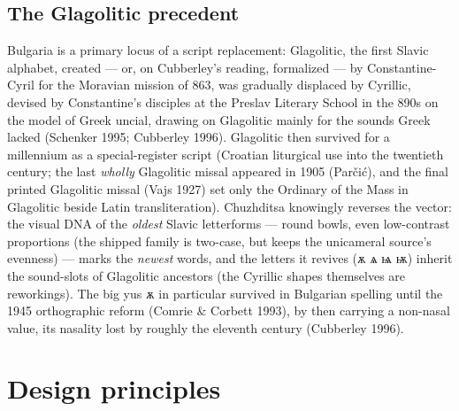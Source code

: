 \documentclass[12pt]{article}
\newcommand{\cz}[1]{{\chu #1}}
\begin{document}
\subsection{The Glagolitic precedent}
Bulgaria is a primary locus of a script replacement: Glagolitic, the first Slavic alphabet, created — or, on Cubberley's reading, formalized — by Constantine-Cyril for the Moravian mission of 863, was gradually displaced by Cyrillic, devised by Constantine's disciples at the Preslav Literary School in the 890s on the model of Greek uncial, drawing on Glagolitic mainly for the sounds Greek lacked (Schenker 1995; Cubberley 1996). Glagolitic then survived for a millennium as a special-register script (Croatian liturgical use into the twentieth century; the last \emph{wholly} Glagolitic missal appeared in 1905 (Par\v{c}i\'c), and the final printed Glagolitic missal (Vajs 1927) set only the Ordinary of the Mass in Glagolitic beside Latin transliteration). Chuzhditsa knowingly reverses the vector: the visual DNA of the \emph{oldest} Slavic letterforms — round bowls, even low-contrast proportions (the shipped family is two-case, but keeps the unicameral source's evenness) — marks the \emph{newest} words, and the letters it revives (\cz{ѫ ѧ ѩ ѭ}) inherit the sound-slots of Glagolitic ancestors (the Cyrillic shapes themselves are reworkings). The big yus \cz{ѫ} in particular survived in Bulgarian spelling until the 1945 orthographic reform (Comrie \& Corbett 1993), by then carrying a non-nasal value, its nasality lost by roughly the eleventh century (Cubberley 1996).

\section{Design principles}
\end{document}
